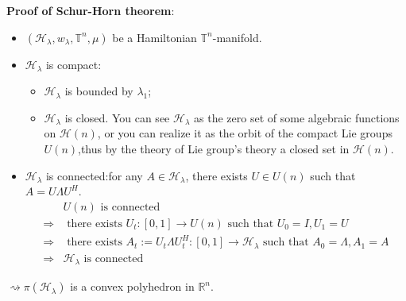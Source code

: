 \documentclass[11pt]{amsart}
\numberwithin{equation}{section}
\theoremstyle{plain}
\theoremstyle{plain}
\numberwithin{equation}{section}
\theoremstyle{remark}
\begin{document}
\textbf{Proof of Schur-Horn theorem}:
\begin{itemize}
	\item $(\mathcal{H}_\lambda,w_\lambda, \mathbb{T}^n, \mu)$ be a Hamiltonian $\mathbb{T}^n$-manifold.
	\item $\mathcal{H}_\lambda$ is compact:
	\begin{itemize}
		\item $\mathcal{H}_\lambda$ is bounded by $\lambda_1$;
		\item $\mathcal{H}_\lambda$ is closed. You can see $\mathcal{H}_\lambda$ as the zero set of some algebraic functions on $\mathcal{H}(n)$, or you can realize it as the orbit of the compact Lie groups $U(n)$,thus by the theory of Lie group's theory a closed set in $\mathcal{H}(n)$.
	\end{itemize}
	\item $\mathcal{H}_\lambda$ is connected:for any $ A \in \mathcal{H}_\lambda$, there exists $U \in U(n)$ such that $A=U\Lambda U^H$.
	\begin{equation*}
		\begin{aligned}
		&U(n) \text{ is connected}\\
		\Rightarrow&\text{ there exists } U_t:[0,1] \rightarrow U(n) \text{ such that } U_0=I, U_1=U\\
		\Rightarrow&\text{ there exists } A_t:=U_t\Lambda U_t^H:[0,1] \rightarrow \mathcal{H}_\lambda \text{ such that } A_0=\Lambda, A_1=A\\
		\Rightarrow&\mathcal{H}_\lambda \text{ is connected}
		\end{aligned}
	\end{equation*}
\end{itemize}
$\rightsquigarrow \pi(\mathcal{H}_\lambda)$ is a convex polyhedron in $\mathbb{R}^n$.
\end{document}
